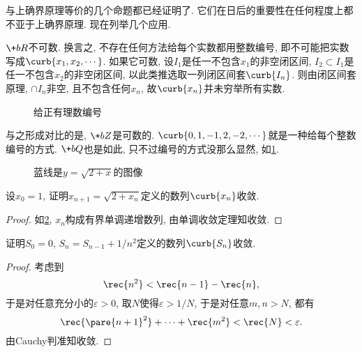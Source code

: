 \documentclass[hidelinks]{ctexart}
\begin{document}
与上确界原理等价的几个命题都已经证明了. {\color{red}它们在日后的重要性在任何程度上都不亚于上确界原理.} 现在列举几个应用.
\begin{sample}
    \begin{ex}
        $\+bR$不可数. 换言之, 不存在任何方法给每个实数都用整数编号, 即不可能把实数写成$\curb{x_1, x_2, \cdots}$. 如果它可数, 设$I_1$是任一不包含$x_1$的非空闭区间, $I_2\subset I_1$是任一不包含$x_2$的非空闭区间, 以此类推选取一列闭区间套$\curb{I_n}$. 则由闭区间套原理, $\cap I_n$非空, 且不包含任何$x_n$, 故$\curb{x_n}$并未穷举所有实数.
    \end{ex}
\end{sample}
\begin{figure}[ht]
    \centering
    \centerline{
    }
    \caption{给正有理数编号}
    \label{fig:给正有理数编号}
\end{figure}
\begin{remark}
    与之形成对比的是, $\+bZ$是可数的. $\curb{0, 1, -1, 2, -2, \cdots}$就是一种给每个整数编号的方式. $\+bQ$也是如此, 只不过编号的方式没那么显然, 如\cref{fig:给正有理数编号}.
\end{remark}
\begin{figure}[ht]
    \centering
    \caption{蓝线是$y=\sqrt{2+x}$的图像}
    \label{fig:sqrt2的图像}
\end{figure}
\begin{sample}
    \begin{ex}
        设$x_0 = 1$, 证明$x_{n+1} = \sqrt{2+x_n}$定义的数列$\curb{x_n}$收敛.
    \end{ex}
    \begin{proof}
        如\cref{fig:sqrt2的图像}, $x_n$构成有界单调递增数列, 由单调收敛定理知收敛.
    \end{proof}
\end{sample}
\begin{sample}
    \begin{ex}
        证明$S_0 = 0$, $S_n = S_{n-1} + 1/n^2$定义的数列$\curb{S_n}$收敛.
    \end{ex}
    \begin{proof}
        考虑到
        \[ \rec{n^2} < \rec{n-1} - \rec{n}, \]
        于是对任意充分小的$\varepsilon>0$, 取$N$使得$\varepsilon>1/N$, 于是对任意$m,n>N$, 都有
        \[ \rec{\pare{n+1}^2} + \cdots + \rec{m^2} < \rec{N} < \varepsilon. \]
        由Cauchy判准知收敛.
    \end{proof}
\end{sample}



\end{document}
